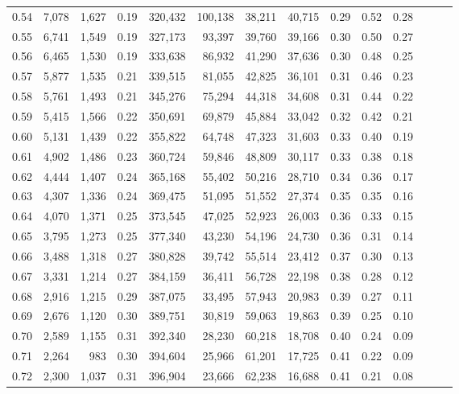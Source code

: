 \begin{tabular}{rrrrrrrrrrrrrr}
0.54 &  7,078 &  1,627 &  0.19 &  320,432 &  100,138 &  38,211 &  40,715 &  0.29 &  0.52 &      0.28 \\
0.55 &  6,741 &  1,549 &  0.19 &  327,173 &   93,397 &  39,760 &  39,166 &  0.30 &  0.50 &      0.27 \\
0.56 &  6,465 &  1,530 &  0.19 &  333,638 &   86,932 &  41,290 &  37,636 &  0.30 &  0.48 &      0.25 \\
0.57 &  5,877 &  1,535 &  0.21 &  339,515 &   81,055 &  42,825 &  36,101 &  0.31 &  0.46 &      0.23 \\
0.58 &  5,761 &  1,493 &  0.21 &  345,276 &   75,294 &  44,318 &  34,608 &  0.31 &  0.44 &      0.22 \\
0.59 &  5,415 &  1,566 &  0.22 &  350,691 &   69,879 &  45,884 &  33,042 &  0.32 &  0.42 &      0.21 \\
0.60 &  5,131 &  1,439 &  0.22 &  355,822 &   64,748 &  47,323 &  31,603 &  0.33 &  0.40 &      0.19 \\
0.61 &  4,902 &  1,486 &  0.23 &  360,724 &   59,846 &  48,809 &  30,117 &  0.33 &  0.38 &      0.18 \\
0.62 &  4,444 &  1,407 &  0.24 &  365,168 &   55,402 &  50,216 &  28,710 &  0.34 &  0.36 &      0.17 \\
0.63 &  4,307 &  1,336 &  0.24 &  369,475 &   51,095 &  51,552 &  27,374 &  0.35 &  0.35 &      0.16 \\
0.64 &  4,070 &  1,371 &  0.25 &  373,545 &   47,025 &  52,923 &  26,003 &  0.36 &  0.33 &      0.15 \\
0.65 &  3,795 &  1,273 &  0.25 &  377,340 &   43,230 &  54,196 &  24,730 &  0.36 &  0.31 &      0.14 \\
0.66 &  3,488 &  1,318 &  0.27 &  380,828 &   39,742 &  55,514 &  23,412 &  0.37 &  0.30 &      0.13 \\
0.67 &  3,331 &  1,214 &  0.27 &  384,159 &   36,411 &  56,728 &  22,198 &  0.38 &  0.28 &      0.12 \\
0.68 &  2,916 &  1,215 &  0.29 &  387,075 &   33,495 &  57,943 &  20,983 &  0.39 &  0.27 &      0.11 \\
0.69 &  2,676 &  1,120 &  0.30 &  389,751 &   30,819 &  59,063 &  19,863 &  0.39 &  0.25 &      0.10 \\
0.70 &  2,589 &  1,155 &  0.31 &  392,340 &   28,230 &  60,218 &  18,708 &  0.40 &  0.24 &      0.09 \\
0.71 &  2,264 &    983 &  0.30 &  394,604 &   25,966 &  61,201 &  17,725 &  0.41 &  0.22 &      0.09 \\
0.72 &  2,300 &  1,037 &  0.31 &  396,904 &   23,666 &  62,238 &  16,688 &  0.41 &  0.21 &      0.08 \\

\end{tabular}

